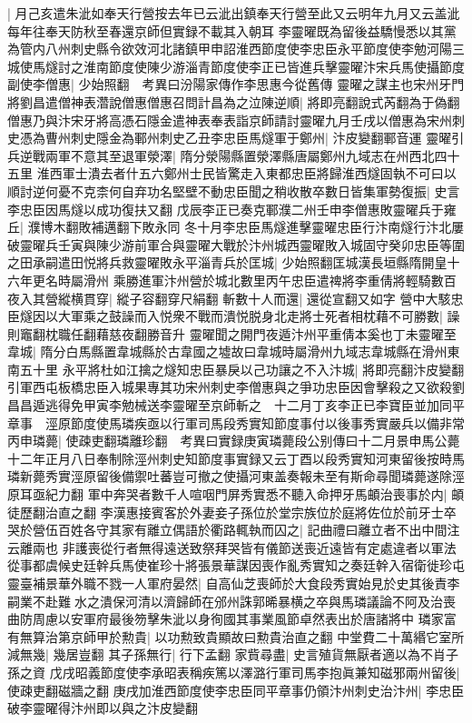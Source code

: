 |{
	月己亥遣朱泚如奉天行營按去年已云泚出鎮奉天行營至此又云明年九月又云盖泚每年往奉天防秋至春還京師但實録不載其入朝耳}
李靈曜既為留後益驕慢悉以其黨為管内八州刺史縣令欲效河北諸鎮甲申詔淮西節度使李忠臣永平節度使李勉河陽三城使馬燧討之淮南節度使陳少游淄青節度使李正已皆進兵擊靈曜汴宋兵馬使攝節度副使李僧惠|{
	少始照翻　考異曰汾陽家傳作李思惠今從舊傳}
靈曜之謀主也宋州牙門將劉昌遣僧神表濳說僧惠僧惠召問計昌為之泣陳逆順|{
	將即亮翻說式芮翻為于偽翻}
僧惠乃與汴宋牙將高憑石隱金遣神表奉表詣京師請討靈曜九月壬戌以僧惠為宋州刺史憑為曹州刺史隱金為鄆州刺史乙丑李忠臣馬燧軍于鄭州|{
	汴皮變翻鄆音運}
靈曜引兵逆戰兩軍不意其至退軍滎澤|{
	隋分滎陽縣置滎澤縣唐屬鄭州九域志在州西北四十五里}
淮西軍士潰去者什五六鄭州士民皆驚走入東都忠臣將歸淮西燧固執不可曰以順討逆何憂不克柰何自弃功名堅壁不動忠臣聞之稍收散卒數日皆集軍勢復振|{
	史言李忠臣因馬燧以成功復扶又翻}
戊辰李正已奏克鄆濮二州壬申李僧惠敗靈曜兵于雍丘|{
	濮博木翻敗補邁翻下敗永同}
冬十月李忠臣馬燧進擊靈曜忠臣行汴南燧行汴北屢破靈曜兵壬寅與陳少游前軍合與靈曜大戰於汴州城西靈曜敗入城固守癸卯忠臣等圍之田承嗣遣田悦將兵救靈曜敗永平淄青兵於匡城|{
	少始照翻匡城漢長垣縣隋開皇十六年更名時屬滑州}
乘勝進軍汴州營於城北數里丙午忠臣遣禆將李重倩將輕騎數百夜入其營縱横貫穿|{
	縱子容翻穿尺絹翻}
斬數十人而還|{
	還從宣翻又如字}
營中大駭忠臣燧因以大軍乘之鼓譟而入悦衆不戰而潰悦脱身北走將士死者相枕藉不可勝數|{
	譟則竈翻枕職任翻藉慈夜翻勝音升}
靈曜聞之開門夜遁汴州平重倩本奚也丁未靈曜至韋城|{
	隋分白馬縣置韋城縣於古韋國之墟故曰韋城時屬滑州九域志韋城縣在滑州東南五十里}
永平將杜如江擒之燧知忠臣暴戾以己功讓之不入汴城|{
	將即亮翻汴皮變翻}
引軍西屯板橋忠臣入城果專其功宋州刺史李僧惠與之爭功忠臣因會擊殺之又欲殺劉昌昌遁逃得免甲寅李勉械送李靈曜至京師斬之　十二月丁亥李正已李寶臣並加同平章事　涇原節度使馬璘疾亟以行軍司馬段秀實知節度事付以後事秀實嚴兵以備非常丙申璘薨|{
	使疎吏翻璘離珍翻　考異曰實録庚寅璘薨段公别傳曰十二月景申馬公薨十二年正月八日奉制除涇州刺史知節度事實録又云丁酉以段秀實知河東留後按時馬璘新薨秀實涇原留後備禦吐蕃豈可撤之使攝河東盖奏報未至有斯命尋聞璘薨遂除涇原耳亟紀力翻}
軍中奔哭者數千人喧咽門屏秀實悉不聽入命押牙馬頔治喪事於内|{
	頔徒歷翻治直之翻}
李漢惠接賓客於外妻妾子孫位於堂宗族位於庭將佐位於前牙士卒哭於營伍百姓各守其家有離立偶語於衢路輒執而囚之|{
	記曲禮曰離立者不出中間注云離兩也}
非護喪從行者無得遠送致祭拜哭皆有儀節送喪近遠皆有定處違者以軍法從事都虞候史廷幹兵馬使崔珍十將張景華謀因喪作亂秀實知之奏廷幹入宿衛徙珍屯靈臺補景華外職不戮一人軍府晏然|{
	自高仙芝喪師於大食段秀實始見於史其後責李嗣業不赴難水之潰保河清以濟歸師在邠州誅郭晞暴横之卒與馬璘議論不阿及治喪曲防周慮以安軍府最後笏擊朱泚以身徇國其事業風節卓然表出於唐諸將中}
璘家富有無算治第京師甲於勲貴|{
	以功勲致貴顯故曰勲貴治直之翻}
中堂費二十萬緡它室所減無幾|{
	幾居豈翻}
其子孫無行|{
	行下孟翻}
家貲尋盡|{
	史言殖貨無厭者適以為不肖子孫之資}
戊戌昭義節度使李承昭表稱疾篤以澤潞行軍司馬李抱眞兼知磁邪兩州留後|{
	使疎吏翻磁牆之翻}
庚戌加淮西節度使李忠臣同平章事仍領汴州刺史治汴州|{
	李忠臣破李靈曜得汴州即以與之汴皮變翻}


